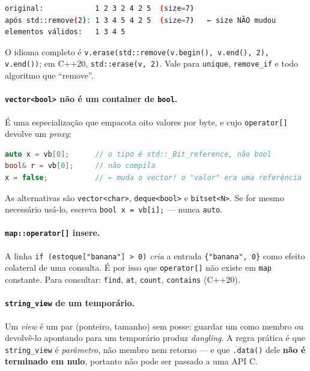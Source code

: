 \begin{lstlisting}[style=bt, language=bash,
    caption={Saída de \texttt{src/stl/}: o \texttt{size} não muda.}]
original:            1 2 3 2 4 2 5  (size=7)
após std::remove(2): 1 3 4 5 4 2 5  (size=7)   ← size NÃO mudou
elementos válidos:   1 3 4 5
\end{lstlisting}

O idioma completo é \texttt{v.erase(std::remove(v.begin(), v.end(), 2),
v.end())}; em C++20, \texttt{std::erase(v, 2)}. Vale para \texttt{unique},
\texttt{remove\_if} e todo algoritmo que ``remove''.

\paragraph{\texttt{vector<bool>} não é um container de \texttt{bool}.} É uma
especialização que empacota oito valores por byte, e cujo \texttt{operator[]}
devolve um \emph{proxy}:

\begin{lstlisting}[style=bt, language=C++,
    caption={O \emph{proxy} que se disfarça de valor.}]
auto x = vb[0];      // o tipo é std::_Bit_reference, não bool
bool& r = vb[0];     // não compila
x = false;           // ← muda o vector! o "valor" era uma referência
\end{lstlisting}

As alternativas são \texttt{vector<char>}, \texttt{deque<bool>} e
\texttt{bitset<N>}. Se for mesmo necessário usá-lo, escreva \texttt{bool x =
vb[i];} --- nunca \texttt{auto}.

\paragraph{\texttt{map::operator[]} insere.} A linha \texttt{if
(estoque["banana"] > 0)} \emph{cria} a entrada \texttt{\{"banana", 0\}} como
efeito colateral de uma consulta. É por isso que \texttt{operator[]} não existe
em \texttt{map} constante. Para consultar: \texttt{find}, \texttt{at},
\texttt{count}, \texttt{contains} (C++20).

\paragraph{\texttt{string\_view} de um temporário.} Um \emph{view} é um par
(ponteiro, tamanho) sem posse: guardar um como membro ou devolvê-lo apontando
para um temporário produz \emph{dangling}. A regra prática é que
\texttt{string\_view} é \emph{parâmetro}, não membro nem retorno --- e que
\texttt{.data()} dele \textbf{não é terminado em nulo}, portanto não pode ser
passado a uma API C.


